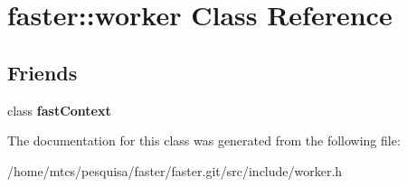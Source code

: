 \hypertarget{classfaster_1_1worker}{}\section{faster\+:\+:worker Class Reference}
\label{classfaster_1_1worker}
\subsection*{Friends}
\begin{DoxyCompactItemize}
\item 
\hypertarget{classfaster_1_1worker_a8ffe9636e25b4912700710d5fd2b5a2a}{}class {\bfseries fast\+Context}\label{classfaster_1_1worker_a8ffe9636e25b4912700710d5fd2b5a2a}

\end{DoxyCompactItemize}


The documentation for this class was generated from the following file\+:\begin{DoxyCompactItemize}
\item 
/home/mtcs/pesquisa/faster/faster.\+git/src/include/worker.\+h\end{DoxyCompactItemize}

